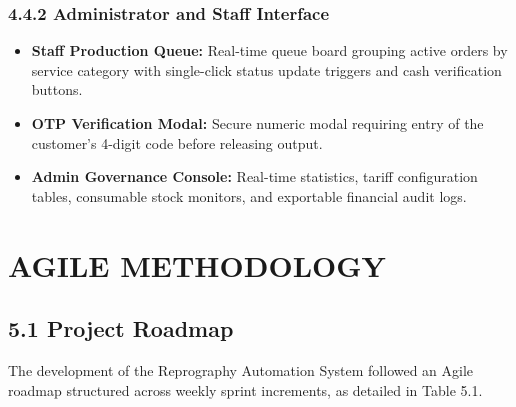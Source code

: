 \documentclass[12pt,a4paper]{report}
\begin{document}
\subsection{4.4.2 Administrator and Staff Interface}
\begin{itemize}[leftmargin=0.35in, itemsep=2pt]
  \item \textbf{Staff Production Queue:} Real-time queue board grouping active orders by service category with single-click status update triggers and cash verification buttons.
  \item \textbf{OTP Verification Modal:} Secure numeric modal requiring entry of the customer's 4-digit code before releasing output.
  \item \textbf{Admin Governance Console:} Real-time statistics, tariff configuration tables, consumable stock monitors, and exportable financial audit logs.
\end{itemize}

\newpage
\chapter{AGILE METHODOLOGY}

\section{5.1 Project Roadmap}
The development of the Reprography Automation System followed an Agile roadmap structured across weekly sprint increments, as detailed in Table 5.1.
\end{document}
